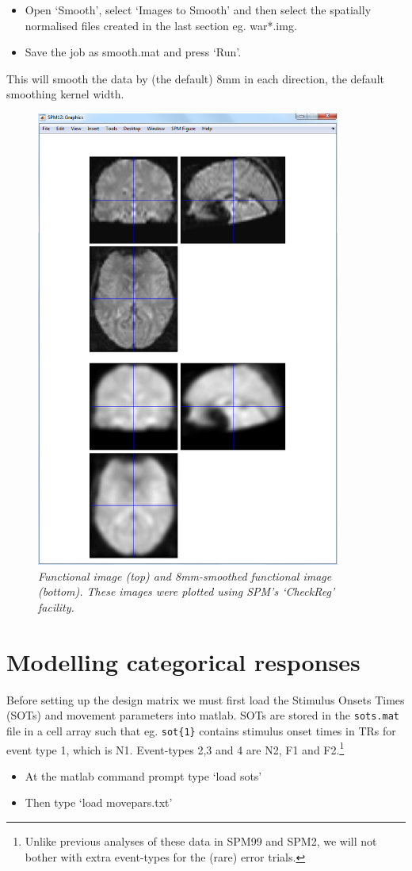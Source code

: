 \documentclass[a4paper,titlepage]{book}
\newcommand{\bi}{\begin{itemize}}
\newcommand{\ei}{\end{itemize}}
\begin{document}
\bi
\item{Open `Smooth', select `Images to Smooth' and then 
select the spatially normalised files created in the 
last section eg. {\sf war*.img}. }
\item{Save the job as {\sf smooth.mat} and press `Run'.}
\ei
This will smooth the data by (the default) 8mm in each direction, 
the default smoothing kernel width.
\begin{figure}
\begin{center}
\includegraphics[width=100mm]{faces/smooth}
\caption{\em Functional image (top) and 8mm-smoothed functional image (bottom). These images were plotted using SPM's `CheckReg' facility. \label{face_smooth}}
\end{center}
\end{figure}

\section{Modelling categorical responses}

Before setting up the design matrix we must first 
load the Stimulus Onsets Times (SOTs) and movement
parameters into matlab. SOTs are stored in the 
\verb!sots.mat! file in a 
cell array such that eg. \verb!sot{1}! contains 
stimulus onset times in TRs for event type 1, which is N1. Event-types 2,3 and 4 are N2, F1 and F2.\footnote{Unlike previous analyses of these data in SPM99 and SPM2, we will not bother with extra event-types for the (rare) error trials.}
\bi
\item{At the matlab command prompt type `load sots'}
\item{Then type `load movepars.txt'}
\ei
\end{document}

